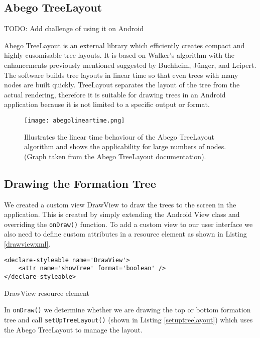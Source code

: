 \documentclass{report}
\begin{document}
\subsection{Abego TreeLayout}
\label{sub:abego_treelayout}

TODO: Add challenge of using it on Android

Abego TreeLayout is an external library which efficiently creates compact and highly cusomisable tree layouts. It is based on Walker's algorithm with the enhancements previously mentioned suggested by Buchheim, J\"unger, and Leipert\cite{treelayoutlineartime}. The software builds tree layouts in linear time so that even trees with many nodes are built quickly. TreeLayout separates the layout of the tree from the actual rendering, therefore it is suitable for drawing trees in an Android application because it is not limited to a specific output or format.

\begin{figure}[ht]
    \centering
    \texttt{[image: abegolineartime.png]}
    \caption{Illustrates the linear time behaviour of the Abego TreeLayout algorithm\cite{abegolineartime} and shows the applicability for large numbers of nodes. (Graph taken from the Abego TreeLayout documentation).}
    \label{abegolineartime}
\end{figure}

\subsection{Drawing the Formation Tree}

We created a custom view DrawView to draw the trees to the screen in the application. This is created by simply extending the Android View class and overriding the {\tt onDraw()} function. To add a custom view to our user interface we also need to define custom attributes in a resource element as shown in Listing \ref{drawviewxml}.

\begin{listing}[ht]
\begin{verbatim}
<declare-styleable name='DrawView'>
    <attr name='showTree' format='boolean' />
</declare-styleable>
\end{verbatim}
\caption{DrawView resource element}
\label{drawviewxml}
\end{listing}

In {\tt onDraw()} we determine whether we are drawing the top or bottom formation tree and call {\tt setUpTreeLayout()} (shown in Listing \ref{setuptreelayout}) which uses the Abego TreeLayout to manage the layout.
\end{document}
